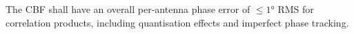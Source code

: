 The CBF shall have an overall per-antenna phase error of $\le \ang{1}$ RMS for
correlation products, including quantisation effects and imperfect phase
tracking.
